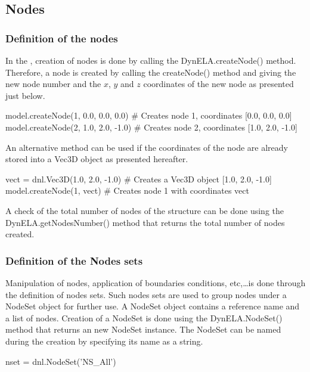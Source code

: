 \subsection{Nodes}

\subsubsection{Definition of the nodes}

In the \DynELA, creation of nodes is done by calling the \textsf{DynELA.createNode()} method. Therefore, a node is created by calling the \textsf{createNode()} method and giving the new node number and the $x$, $y$ and $z$ coordinates of the new node as presented just below.

\begin{PythonListing}
model.createNode(1, 0.0, 0.0, 0.0)  # Creates node 1, coordinates [0.0, 0.0, 0.0]
model.createNode(2, 1.0, 2.0, -1.0) # Creates node 2, coordinates [1.0, 2.0, -1.0]
\end{PythonListing}

An alternative method can be used if the coordinates of the node are already stored into a Vec3D object as presented hereafter.

\begin{PythonListing}
vect = dnl.Vec3D(1.0, 2.0, -1.0) # Creates a Vec3D object [1.0, 2.0, -1.0]
model.createNode(1, vect)        # Creates node 1 with coordinates vect
\end{PythonListing}

A check of the total number of nodes of the structure can be done using the \textsf{DynELA.getNodesNumber()} method that returns the total number of nodes created.

\subsubsection{Definition of the Nodes sets}

Manipulation of nodes, application of boundaries conditions, etc,\ldots is done through the definition of nodes sets. Such nodes sets are used to group nodes under a \textsf{NodeSet} object for further use. A \textsf{NodeSet} object contains a reference name and a list of nodes. Creation of a \textsf{NodeSet} is done using the \textsf{DynELA.NodeSet()} method that returns an new \textsf{NodeSet} instance. The \textsf{NodeSet} can be named during the creation by specifying its name as a string.

\begin{PythonListing}
nset = dnl.NodeSet('NS_All')
\end{PythonListing}


